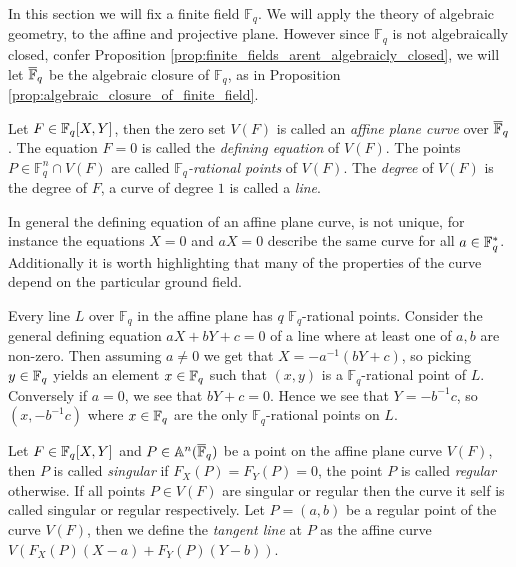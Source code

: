 In this section we will fix a finite field $\mathbb{F}_{q}$. We will apply the theory of algebraic geometry, to the affine and projective plane.
However since $\mathbb{F}_{q}$ is not algebraically closed, confer Proposition \ref{prop:finite_fields_arent_algebraicly_closed}, we will let $\overline{\mathbb{F}}_{q}$ be the algebraic closure of $\mathbb{F}_{q}$, as in Proposition \ref{prop:algebraic_closure_of_finite_field}.

\begin{definition}\label{def:affine_plane_curve}
  Let $F \in \mathbb{F}_{q}[X, Y]$, then the zero set $V(F)$ is called an \textit{affine plane curve} over $\overline{\mathbb{F}}_{q}$. The equation $F = 0$ is called the \textit{defining equation} of $V(F)$. The points $P \in \mathbb{F}_{q}^{n} \cap V(F)$ are called \textit{$\mathbb{F}_q$-rational points} of $V(F)$. The \textit{degree} of $V(F)$ is the degree of $F$, a curve of degree $1$ is called a \textit{line}.
\end{definition}
In general the defining equation of an affine plane curve, is not unique, for instance the equations $X = 0$ and $aX = 0$ describe the same curve for all $a \in \mathbb{F}_{q}^{*}$.
Additionally it is worth highlighting that many of the properties of the curve depend on the particular ground field.

\begin{example}\label{exmp:affine_line}
  Every line $L$ over $\mathbb{F}_{q}$ in the affine plane has $q$ $\mathbb{F}_{q}$-rational points. Consider the general defining equation $aX + bY + c = 0$ of a line where at least one of $a, b$ are non-zero.
  Then assuming $a \neq 0$ we get that $X = - a^{-1}(bY + c)$, so picking $y \in \mathbb{F}_{q}$ yields an element $x \in \mathbb{F}_{q}$ such that $(x, y)$ is a $\mathbb{F}_{q}$-rational point of $L$.
  Conversely if $a = 0$, we see that $bY + c = 0$. Hence we see that $Y = -b^{-1}c$, so $(x, -b^{-1}c)$ where $x \in \mathbb{F}_{q}$ are the only $\mathbb{F}_{q}$-rational points on $L$.
\end{example}
\begin{definition}
  Let $F \in \mathbb{F}_{q}[X, Y]$ and $P \in \mathbb{A}^{n}(\overline{\mathbb{F}}_{q})$ be a point on the affine plane curve $V(F)$, then $P$ is called \textit{singular} if $F_{X}(P) = F_{Y}(P) = 0$, the point $P$ is called \textit{regular} otherwise. If all points $P \in V(F)$ are singular or regular then the curve it self is called singular or regular respectively.
  Let $P = (a, b)$ be a regular point of the curve $V(F)$, then we define the \textit{tangent line} at $P$ as the affine curve $V \left(F_{X}(P)(X - a) + F_{Y}(P)(Y - b)\right)$.
\end{definition}



